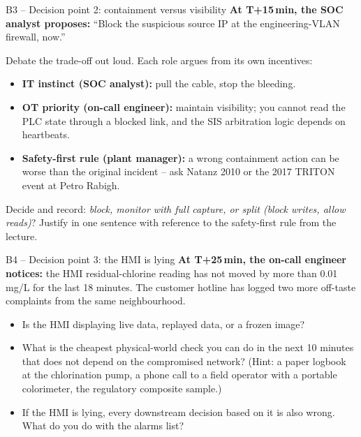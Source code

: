 \documentclass[11pt,a4paper]{article}
\begin{document}
\begin{stepbox}{B3 -- Decision point 2: containment versus visibility}
\textbf{At T+15\,min, the SOC analyst proposes:} ``Block the suspicious source IP at the engineering-VLAN firewall, now.''

Debate the trade-off out loud. Each role argues from its own incentives:
\begin{itemize}\setlength{\itemsep}{1pt}
  \item \textbf{IT instinct (SOC analyst):} pull the cable, stop the bleeding.
  \item \textbf{OT priority (on-call engineer):} maintain visibility; you cannot read the PLC state through a blocked link, and the SIS arbitration logic depends on heartbeats.
  \item \textbf{Safety-first rule (plant manager):} a wrong containment action can be worse than the original incident -- ask Natanz 2010 or the 2017 TRITON event at Petro Rabigh.
\end{itemize}
Decide and record: \emph{block, monitor with full capture, or split (block writes, allow reads)}? Justify in one sentence with reference to the safety-first rule from the lecture.
\end{stepbox}

\begin{stepbox}{B4 -- Decision point 3: the HMI is lying}
\textbf{At T+25\,min, the on-call engineer notices:} the HMI residual-chlorine reading has not moved by more than 0.01\,mg/L for the last 18 minutes. The customer hotline has logged two more off-taste complaints from the same neighbourhood.

\begin{itemize}\setlength{\itemsep}{1pt}
  \item Is the HMI displaying live data, replayed data, or a frozen image?
  \item What is the cheapest physical-world check you can do in the next 10 minutes that does not depend on the compromised network? (Hint: a paper logbook at the chlorination pump, a phone call to a field operator with a portable colorimeter, the regulatory composite sample.)
  \item If the HMI is lying, every downstream decision based on it is also wrong. What do you do with the alarms list?
\end{itemize}
\end{stepbox}
\end{document}
